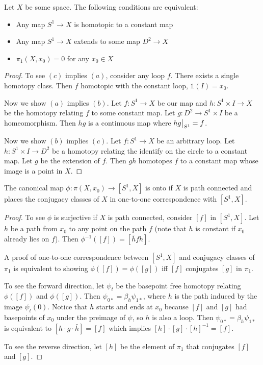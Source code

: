 \documentclass[10pt]{article}
\newcommand\restr[2]{{%
  \left.\kern-\nulldelimiterspace %
  #1 %
  \vphantom{\big|} %
  \right|_{#2} %
}}
\begin{document}
\begin{exercise}[1.1.5]
	Let $X$ be some space. The following conditions are equivalent:
	\begin{itemize}
		\item{Any map $S^1 \to X$ is homotopic to a constant map}
		\item{Any map $S^1 \to X$ extends to some map $D^2 \to X$}
		\item{$\pi_1(X, x_0) = 0$ for any $x_0 \in X$}
	\end{itemize}
\end{exercise}

\begin{proof}
	To see $(c)$ implies $(a)$, consider any loop $f$. There exists a single homotopy class. Then $f$ homotopic with the constant loop, $\mathds{1}(I) = x_0$.
	\par Now we show $(a)$ implies $(b)$. Let $f: S^1 \to X$ be our map and $h: S^1 \times I \to X$ be the homotopy relating $f$ to some constant map. Let $g: D^2 \to S^1 \times I$ be a homeomorphism. Then $hg$ is a continuous map where $\restr{hg}{S^1} = f$.
	\par Now we show $(b)$ implies $(c)$. Let $f: S^1 \to X$ be an arbitrary loop. Let $h: S^1 \times I \to D^2$ be a homotopy relating the identify on the circle to a constant map. Let $g$ be the extension of $f$. Then $gh$ homotopes $f$ to a constant map whose image is a point in $X$.
\end{proof}

\begin{exercise}[1.1.6]
	The canonical map $\phi: \pi(X, x_0) \to [S^1, X]$ is onto if $X$ is path connected and places the conjugacy classes of $X$ in one-to-one correspondence with $[S^1, X]$.
\end{exercise}

\begin{proof}
	To see $\phi$ is surjective if $X$ is path connected, consider $[f]$ in $[S^1, X]$. Let $h$ be a path from $x_0$ to any point on the path $f$ (note that $h$ is constant if $x_0$ already lies on $f$). Then $\phi^{-1}([f]) = [\bar{h}fh]$.
	\par A proof of one-to-one correspondence between $[S^1, X]$ and conjugacy classes of $\pi_1$ is equivalent to showing $\phi([f]) = \phi([g])$ iff $[f]$ conjugates $[g]$ in $\pi_1$. 
	\par To see the forward direction, let $\psi_t$ be the basepoint free homotopy relating $\phi([f])$ and $\phi([g])$. Then $\psi_{0*} = \beta_h\psi_{1*}$, where $h$ is the path induced by the image $\psi_t(0)$. Notice that $h$ starts and ends at $x_0$ because $[f]$ and $[g]$ had basepoints of $x_0$ under the preimage of $\psi$, so $h$ is also a loop. Then $\psi_{0*} = \beta_h\psi_{1*}$ is equivalent to $[h \cdot g \cdot \bar{h}] = [f]$ which implies $[h] \cdot [g] \cdot [h]^{-1} = [f]$.
	\par To see the reverse direction, let $[h]$ be the element of $\pi_1$ that conjugates $[f]$ and $[g]$.

\end{proof}
\end{document}

